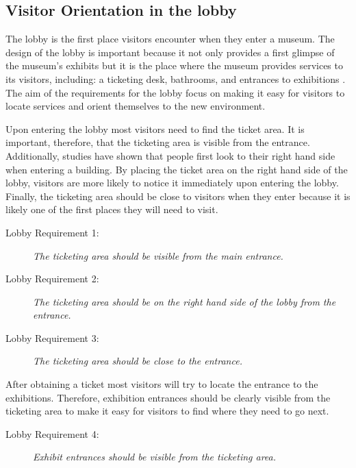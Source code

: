 \documentclass[12pt]{ucthesis}
\begin{document}
\subsection{Visitor Orientation in the lobby}
The lobby is the first place visitors encounter when they enter a museum. The design of the lobby is important because it not only provides a first glimpse of the museum's exhibits but it is the place where the museum provides services to its visitors, including: a ticketing desk, bathrooms, and entrances to exhibitions \cite{Bitgood02}. The aim of the requirements for the lobby focus on making it easy for visitors to locate services and orient themselves to the new environment. 

Upon entering the lobby most visitors need to find the ticket area. It is important, therefore, that the ticketing area is visible from the entrance. Additionally, studies have shown that people first look to their right hand side when entering a building. By placing the ticket area on the right hand side of the lobby, visitors are more likely to notice it immediately upon entering the lobby. Finally, the ticketing area should be close to visitors when they enter because it is likely one of the first places they will need to visit.
\begin{description}
\item[Lobby Requirement 1:] \emph{The ticketing area should be visible from the main entrance.}
\item[Lobby Requirement 2:] \emph{The ticketing area should be on the right hand side of the lobby from the entrance.}
\item[Lobby Requirement 3:] \emph{The ticketing area should be close to the entrance.}
\end{description}

After obtaining a ticket most visitors will try to locate the entrance to the exhibitions. Therefore, exhibition entrances should be clearly visible from the ticketing area to make it easy for visitors to find where they need to go next. 
\begin{description}
\item[Lobby Requirement 4:] \emph{Exhibit entrances should be visible from the ticketing area.}
\end{description}

\end{document}
